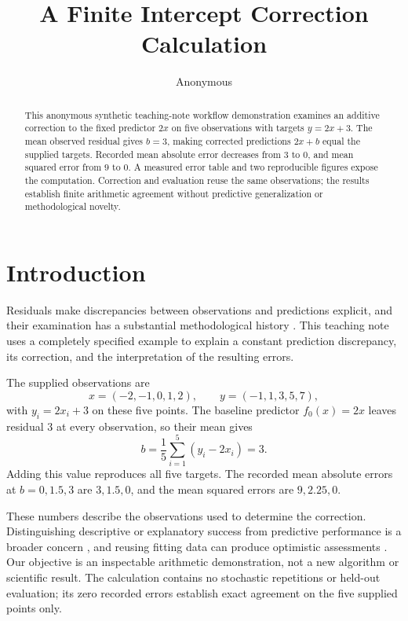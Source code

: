 \documentclass[11pt]{article}
\title{A Finite Intercept Correction Calculation}
\author{Anonymous}
\date{}
\begin{document}
\maketitle
\begin{abstract}
This anonymous synthetic teaching-note workflow demonstration examines an additive correction to the fixed predictor $2x$ on five observations with targets $y=2x+3$. The mean observed residual gives $b=3$, making corrected predictions $2x+b$ equal the supplied targets. Recorded mean absolute error decreases from $3$ to $0$, and mean squared error from $9$ to $0$. A measured error table and two reproducible figures expose the computation. Correction and evaluation reuse the same observations; the results establish finite arithmetic agreement without predictive generalization or methodological novelty.
\end{abstract}
\section{Introduction}

Residuals make discrepancies between observations and predictions explicit, and their examination has a substantial methodological history \cite{Anscombe1963ExaminationAnalysis,Denby1987ExampleUse,Chatterjee1986InfluentialObservations,Cook1977DetectionInfluential}. This teaching note uses a completely specified example to explain a constant prediction discrepancy, its correction, and the interpretation of the resulting errors.

The supplied observations are
\[
x=(-2,-1,0,1,2), \qquad y=(-1,1,3,5,7),
\]
with $y_i=2x_i+3$ on these five points. The baseline predictor $f_0(x)=2x$ leaves residual $3$ at every observation, so their mean gives
\[
b=\frac{1}{5}\sum_{i=1}^{5}(y_i-2x_i)=3.
\]
Adding this value reproduces all five targets. The recorded mean absolute errors at $b=0,1.5,3$ are $3,1.5,0$, and the mean squared errors are $9,2.25,0$.

These numbers describe the observations used to determine the correction. Distinguishing descriptive or explanatory success from predictive performance is a broader concern \cite{Shmueli2010ExplainOr,Yarkoni2017ChoosingPrediction}, and reusing fitting data can produce optimistic assessments \cite{Efron1986HowBiased,Efron2004EstimationPrediction}. Our objective is an inspectable arithmetic demonstration, not a new algorithm or scientific result. The calculation contains no stochastic repetitions or held-out evaluation; its zero recorded errors establish exact agreement on the five supplied points only.
\end{document}
